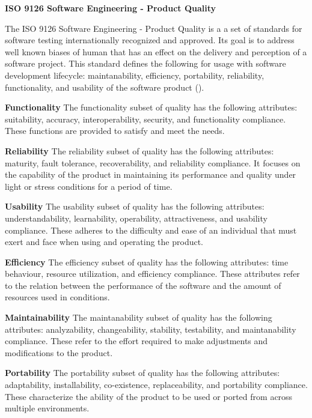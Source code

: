 \flushleft
\textbf{ISO 9126 Software Engineering - Product Quality}\\
\justifying

\parx
The ISO 9126 Software Engineering - Product Quality is a a set of standards for
software testing internationally recognized and approved. Its goal is to
address well known biases of human that has an effect on the delivery and
perception of a software project. This standard defines the following for usage
with software development lifecycle: maintanability, efficiency, portability,
reliability, functionality, and usability of the software product (\cite{iso_9126}).

\parx
\textbf{Functionality}
\justifying
The functionality subset of quality has the following attributes: suitability,
accuracy, interoperability, security, and functionality compliance. These functions
are provided to satisfy and meet the needs.

\parx
\textbf{Reliability}
\justifying
The reliability subset of quality has the following attributes: maturity, fault tolerance,
recoverability, and reliability compliance. It focuses on the capability of the product
in maintaining its performance and quality under light or stress conditions for a period
of time.

\parx
\textbf{Usability}
\justifying
The usability subset of quality has the following attributes: understandability, learnability,
operability, attractiveness, and usability compliance. These adheres to the difficulty and
ease of an individual that must exert and face when using and operating the product.

\parx
\textbf{Efficiency}
\justifying
The efficiency subset of quality has the following attributes: time behaviour, resource
utilization, and efficiency compliance. These attributes refer to the relation between
the performance of the software and the amount of resources used in conditions.

\parx
\textbf{Maintainability}
\justifying
The maintanability subset of quality has the following attributes: analyzability,
changeability, stability, testability, and maintanability compliance. These refer to
the effort required to make adjustments and modifications to the product.

\parx
\textbf{Portability}
\justifying
The portability subset of quality has the following attributes: adaptability,
installability, co-existence, replaceability, and portability compliance. These
characterize the ability of the product to be used or ported from across multiple
environments.
